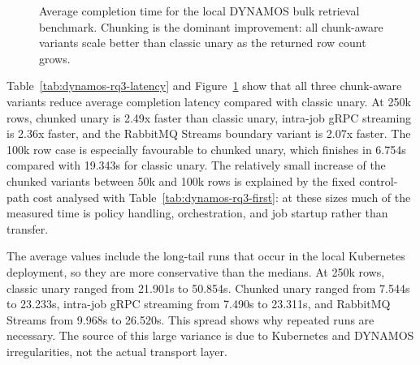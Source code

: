 \begin{figure}[!t]
    \centering
    \caption{Average completion time for the local DYNAMOS bulk retrieval benchmark. Chunking is the dominant improvement: all chunk-aware variants scale better than classic unary as the returned row count grows.}
    \label{fig:dynamos-rq3-latency}
\end{figure}

Table~\ref{tab:dynamos-rq3-latency} and Figure~\ref{fig:dynamos-rq3-latency} show that all three chunk-aware variants reduce average completion latency compared with classic unary. At 250k rows, chunked unary is 2.49x faster than classic unary, intra-job gRPC streaming is 2.36x faster, and the RabbitMQ Streams boundary variant is 2.07x faster. The 100k row case is especially favourable to chunked unary, which finishes in 6.754s compared with 19.343s for classic unary. The relatively small increase of the chunked variants between 50k and 100k rows is explained by the fixed control-path cost analysed with Table~\ref{tab:dynamos-rq3-first}: at these sizes much of the measured time is policy handling, orchestration, and job startup rather than transfer.

The average values include the long-tail runs that occur in the local Kubernetes deployment, so they are more conservative than the medians. At 250k rows, classic unary ranged from 21.901s to 50.854s. Chunked unary ranged from 7.544s to 23.233s, intra-job gRPC streaming from 7.490s to 23.311s, and RabbitMQ Streams from 9.968s to 26.520s. This spread shows why repeated runs are necessary. The source of this large variance is due to Kubernetes and DYNAMOS irregularities, not the actual transport layer.

